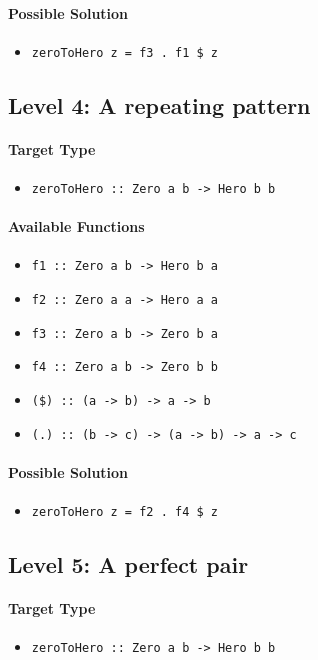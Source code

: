 \documentclass[preprint,12pt]{elsarticle}
\begin{document}
\paragraph{Possible Solution} 
\begin{itemize}
    \item \texttt{zeroToHero z = f3 . f1 \$ z}
\end{itemize}


\subsection{Level 4: A repeating pattern}
\paragraph{Target Type } 
\begin{itemize}
    \item \texttt{zeroToHero :: Zero a b -> Hero b b}
\end{itemize}

\paragraph{Available Functions} 
\begin{itemize}
    \item \texttt{f1 :: Zero a b -> Hero b a}
    \item \texttt{f2 :: Zero a a -> Hero a a}
    \item \texttt{f3 :: Zero a b -> Zero b a}
    \item \texttt{f4 :: Zero a b -> Zero b b}
    \item \texttt{(\$) :: (a -> b) -> a -> b}
    \item \texttt{(.) :: (b -> c) -> (a -> b) -> a -> c}
\end{itemize}

\paragraph{Possible Solution} 
\begin{itemize}
    \item \texttt{zeroToHero z = f2 . f4 \$ z}
\end{itemize}


\subsection{Level 5: A perfect pair}
\paragraph{Target Type } 
\begin{itemize}
    \item \texttt{zeroToHero :: Zero a b -> Hero b b}
\end{itemize}
\end{document}
